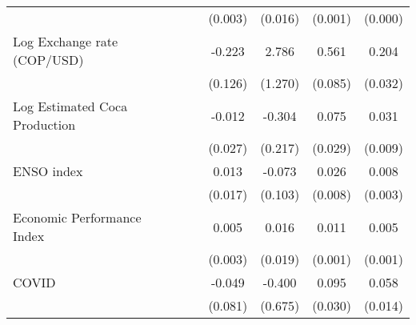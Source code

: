 \begin{tabular}{lcccccccc}
                    &                     &                     &                     &                     &     (0.003)         &     (0.016)         &     (0.001)         &     (0.000)         \\
\addlinespace
Log Exchange rate (COP/USD)&                     &                     &                     &                     &      -0.223         &       2.786\sym{*}  &       0.561\sym{***}&       0.204\sym{***}\\
                    &                     &                     &                     &                     &     (0.126)         &     (1.270)         &     (0.085)         &     (0.032)         \\
\addlinespace
Log Estimated Coca Production&                     &                     &                     &                     &      -0.012         &      -0.304         &       0.075\sym{**} &       0.031\sym{**} \\
                    &                     &                     &                     &                     &     (0.027)         &     (0.217)         &     (0.029)         &     (0.009)         \\
\addlinespace
ENSO index          &                     &                     &                     &                     &       0.013         &      -0.073         &       0.026\sym{**} &       0.008\sym{*}  \\
                    &                     &                     &                     &                     &     (0.017)         &     (0.103)         &     (0.008)         &     (0.003)         \\
\addlinespace
Economic Performance Index&                     &                     &                     &                     &       0.005         &       0.016         &       0.011\sym{***}&       0.005\sym{***}\\
                    &                     &                     &                     &                     &     (0.003)         &     (0.019)         &     (0.001)         &     (0.001)         \\
\addlinespace
COVID               &                     &                     &                     &                     &      -0.049         &      -0.400         &       0.095\sym{**} &       0.058\sym{***}\\
                    &                     &                     &                     &                     &     (0.081)         &     (0.675)         &     (0.030)         &     (0.014)         \\

\end{tabular}
